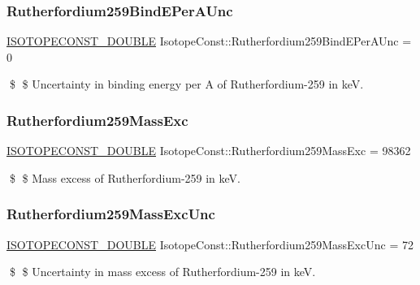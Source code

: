 \subsubsection{\texorpdfstring{Rutherfordium259\+Bind\+E\+Per\+A\+Unc}{Rutherfordium259BindEPerAUnc}}
{\footnotesize\ttfamily \mbox{\hyperlink{group___isotope_const-_macros_ga8f45a7272ce02c0b4c65c44636ed719a}{I\+S\+O\+T\+O\+P\+E\+C\+O\+N\+S\+T\+\_\+\+D\+O\+U\+B\+LE}} Isotope\+Const\+::\+Rutherfordium259\+Bind\+E\+Per\+A\+Unc = 0}

\$ \$ Uncertainty in binding energy per A of Rutherfordium-\/259 in keV. \mbox{\label{group___isotope_const-_rutherfordium-_rf259_ga4dfe8c9a281eef90dac159dce3ff9e86}} 
\subsubsection{\texorpdfstring{Rutherfordium259\+Mass\+Exc}{Rutherfordium259MassExc}}
{\footnotesize\ttfamily \mbox{\hyperlink{group___isotope_const-_macros_ga8f45a7272ce02c0b4c65c44636ed719a}{I\+S\+O\+T\+O\+P\+E\+C\+O\+N\+S\+T\+\_\+\+D\+O\+U\+B\+LE}} Isotope\+Const\+::\+Rutherfordium259\+Mass\+Exc = 98362}

\$ \$ Mass excess of Rutherfordium-\/259 in keV. \mbox{\label{group___isotope_const-_rutherfordium-_rf259_ga0a94abd4607aacd958c69df7d3282f61}} 
\subsubsection{\texorpdfstring{Rutherfordium259\+Mass\+Exc\+Unc}{Rutherfordium259MassExcUnc}}
{\footnotesize\ttfamily \mbox{\hyperlink{group___isotope_const-_macros_ga8f45a7272ce02c0b4c65c44636ed719a}{I\+S\+O\+T\+O\+P\+E\+C\+O\+N\+S\+T\+\_\+\+D\+O\+U\+B\+LE}} Isotope\+Const\+::\+Rutherfordium259\+Mass\+Exc\+Unc = 72}

\$ \$ Uncertainty in mass excess of Rutherfordium-\/259 in keV. \mbox{\label{group___isotope_const-_rutherfordium-_rf259_ga3f0a2fc33a7b20bada6dc76f7b9d38e2}} 
